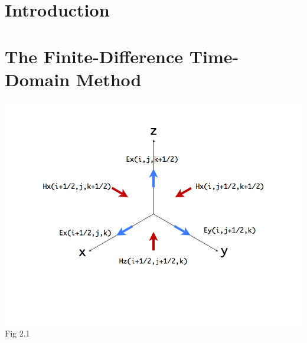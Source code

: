 \documentclass[openany]{book}
\begin{document}
\fontsize{12}{2.0em}\selectfont


\frontmatter




\tableofcontents





\mainmatter

\chapter{Introduction}




\chapter{The Finite-Difference Time-Domain Method}





\clearpage
\begin{center}
  \includegraphics[scale=0.5]{images/yee-grid.jpg}\\
  Fig 2.1
\end{center}
\end{document}
